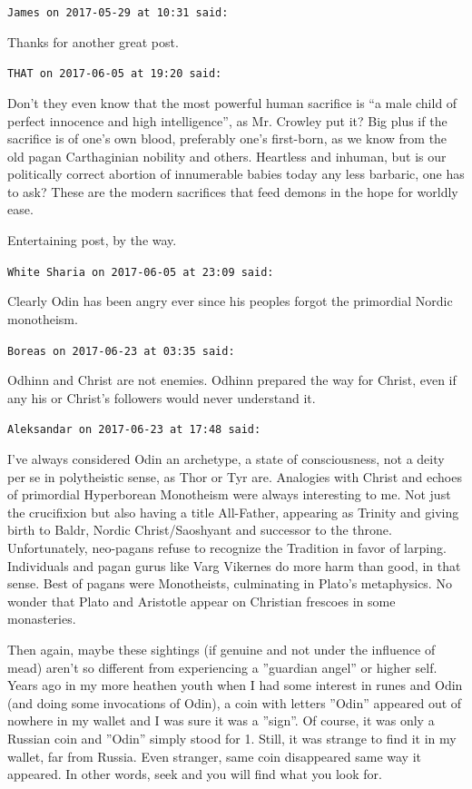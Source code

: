 \begin{footnotesize}
\begin{sffamily}

\texttt{James on 2017-05-29 at 10:31 said:}

Thanks for another great post.

\hfill

\texttt{THAT on 2017-06-05 at 19:20 said:}

Don't they even know that the most powerful human sacrifice is ``a male child of perfect innocence and high intelligence'', as Mr. Crowley put it? Big plus if the sacrifice is of one's own blood, preferably one's first-born, as we know from the old pagan Carthaginian nobility and others. Heartless and inhuman, but is our politically correct abortion of innumerable babies today any less barbaric, one has to ask? These are the modern sacrifices that feed demons in the hope for worldly ease.

Entertaining post, by the way.

\hfill

\texttt{White Sharia on 2017-06-05 at 23:09 said:}

Clearly Odin has been angry ever since his peoples forgot the primordial Nordic monotheism.

\hfill

\texttt{Boreas on 2017-06-23 at 03:35 said:}

Odhinn and Christ are not enemies. Odhinn prepared the way for Christ, even if any his or Christ's followers would never understand it.

\hfill

\texttt{Aleksandar on 2017-06-23 at 17:48 said:}

I've always considered Odin an archetype, a state of consciousness, not a deity per se in polytheistic sense, as Thor or Tyr are. Analogies with Christ and echoes of primordial Hyperborean Monotheism were always interesting to me. Not just the crucifixion but also having a title All-Father, appearing as Trinity and giving birth to Baldr, Nordic Christ/Saoshyant and successor to the throne. Unfortunately, neo-pagans refuse to recognize the Tradition in favor of larping. Individuals and pagan gurus like Varg Vikernes do more harm than good, in that sense. Best of pagans were Monotheists, culminating in Plato's metaphysics. No wonder that Plato and Aristotle appear on Christian frescoes in some monasteries.

Then again, maybe these sightings (if genuine and not under the influence of mead) aren't so different from experiencing a ''guardian angel'' or higher self. Years ago in my more heathen youth when I had some interest in runes and Odin (and doing some invocations of Odin), a coin with letters ''Odin'' appeared out of nowhere in my wallet and I was sure it was a ''sign''. Of course, it was only a Russian coin and ''Odin'' simply stood for 1. Still, it was strange to find it in my wallet, far from Russia. Even stranger, same coin disappeared same way it appeared. In other words, seek and you will find what you look for.


\end{sffamily}
\end{footnotesize}
